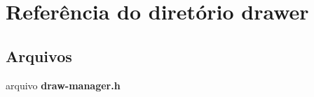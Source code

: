 \section{Referência do diretório drawer}
\label{dir_954e1752bfba3278cb7be295160eeeee}
\subsection*{Arquivos}
\begin{DoxyCompactItemize}
\item 
arquivo {\bf draw-\/manager.\+h}
\end{DoxyCompactItemize}
